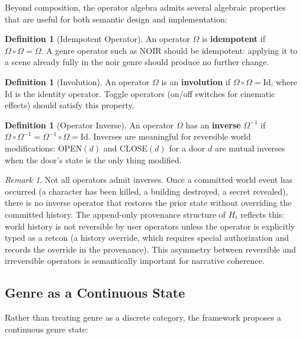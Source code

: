 \documentclass[12pt,a4paper]{article}
\theoremstyle{plain}
\theoremstyle{definition}
\newtheorem{definition}[theorem]{Definition}
\theoremstyle{remark}
\newtheorem{remark}[theorem]{Remark}
\begin{document}
Beyond composition, the operator algebra admits several algebraic properties that are useful for both semantic design and implementation:

\begin{definition}[Idempotent Operator]
An operator $\Omega$ is \textbf{idempotent} if $\Omega \circ \Omega = \Omega$. A genre operator such as \textsc{NOIR} should be idempotent: applying it to a scene already fully in the noir genre should produce no further change.
\end{definition}

\begin{definition}[Involution]
An operator $\Omega$ is an \textbf{involution} if $\Omega \circ \Omega = \mathrm{Id}$, where $\mathrm{Id}$ is the identity operator. Toggle operators (on/off switches for cinematic effects) should satisfy this property.
\end{definition}

\begin{definition}[Operator Inverse]
An operator $\Omega$ has an \textbf{inverse} $\Omega^{-1}$ if $\Omega \circ \Omega^{-1} = \Omega^{-1} \circ \Omega = \mathrm{Id}$. Inverses are meaningful for reversible world modifications: \textsc{OPEN}$(d)$ and \textsc{CLOSE}$(d)$ for a door $d$ are mutual inverses when the door's state is the only thing modified.
\end{definition}

\begin{remark}
Not all operators admit inverses. Once a committed world event has occurred (a character has been killed, a building destroyed, a secret revealed), there is no inverse operator that restores the prior state without overriding the committed history. The append-only provenance structure of $H_t$ reflects this: world history is not reversible by user operators unless the operator is explicitly typed as a retcon (a history override, which requires special authorization and records the override in the provenance). This asymmetry between reversible and irreversible operators is semantically important for narrative coherence.
\end{remark}

\subsection{Genre as a Continuous State}

Rather than treating genre as a discrete category, the framework proposes a continuous genre state:
\end{document}
